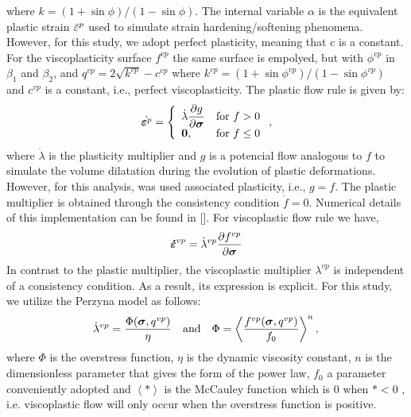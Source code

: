 \documentclass[a4paper,fleqn]{cas-sc}
\begin{document}
where $k = (1+\sin{\phi})/(1-\sin{\phi})$. The internal variable $\alpha$ is the equivalent plastic strain $\bar \varepsilon^p$ used to simulate strain hardening/softening phenomena. However, for this study, we adopt perfect plasticity, meaning that c is a constant. For the viscoplasticity surface $f^{vp}$ the same surface is empolyed, but with $\phi^{vp}$ in $\beta_1$ and $\beta_2$, and $q^{vp} = 2\sqrt{k^{vp}}-c^{vp}$ where $k^{vp} = (1+\sin{\phi^{vp}})/(1-\sin{\phi^{vp}})$ and $c^{vp}$ is a constant, i.e., perfect viscoplasticity. 
The plastic flow rule is given by:
\begin{equation}
	\label{eq_plastic_flow}
	\dot {\boldsymbol{\varepsilon}^{p}} = \left\{ 
	\begin{array}{ll} 
		\dot \lambda \dfrac{\partial g}{\partial \boldsymbol{\sigma}} &  \text{for } f > 0 \\ 
		\boldsymbol 0, & \text{for } f \le 0 \\
	\end{array}\right.,
\end{equation}
where $\dot \lambda$ is the plasticity multiplier and $g$ is a potencial flow analogous to $f$ to simulate the volume dilatation during the evolution of plastic deformations. However, for this analysis, was used associated plasticity, i.e., $g=f$. The plastic multiplier is obtained through the consistency condition $\dot f = 0$. Numerical details of this implementation can be found in []. For viscoplastic flow rule we have,
\begin{equation}
	\label{eq_viscoplastic_flow}
	\boldsymbol{\dot{\varepsilon}}^{vp} = \dot \lambda^{vp} \dfrac{\partial f^{vp}}{\partial \boldsymbol{\sigma}}
\end{equation}
In contrast to the plastic multiplier, the viscoplastic multiplier $\lambda^{vp}$ is independent of a consistency condition. As a result, its expression is explicit. For this study, we utilize the Perzyna model as follows:
\begin{equation} \label{eq_perzyna_model}
	\dot \lambda^{vp} = \dfrac{\Phi(\boldsymbol{\sigma},q^{vp})}{\eta}~~~\text{and}~~~\Phi = \left\langle  \dfrac{f^{vp}(\boldsymbol{\sigma},q^{vp})}{f_0} \right\rangle^n, \,
\end{equation} where $\Phi$ is the overstress function, $\eta$ is the dynamic viscosity constant, $n$ is the dimensionless parameter that gives the form of the power law, $f_0$ a parameter conveniently adopted and $\left\langle * \right\rangle$ is the McCauley function which is $0$ when $* <0$ , i.e. viscoplastic flow will only occur when the overstress function is positive.
\end{document}
